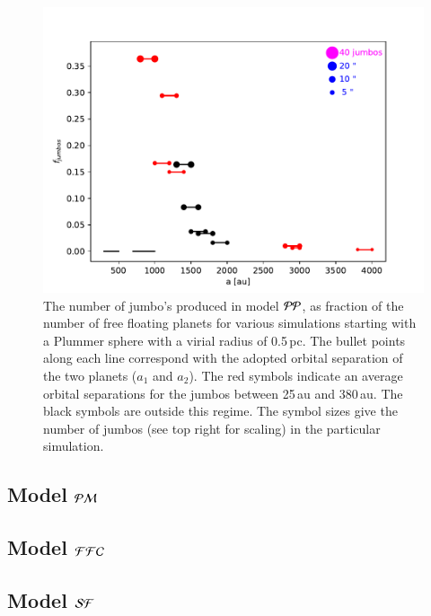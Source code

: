 \documentclass[aa]{lib/aa}
\begin{document}
\begin{figure}
    \centering
        \includegraphics[width=.91\columnwidth]{figures/fig_fjumbos_from_psystems.pdf}
        \caption{The number of jumbo's produced in model ${\cal PP}$,
          as fraction of the number of free floating planets for
          various simulations starting with a Plummer sphere with a
          virial radius of 0.5\,pc.  The bullet points along each line
          correspond with the adopted orbital separation of the two
          planets ($a_1$ and $a_2$).  The red symbols indicate an
          average orbital separations for the jumbos between 25\,au
          and 380\,au.  The black symbols are outside this regime.
          The symbol sizes give the number of jumbos (see top right
          for scaling) in the particular simulation.  }
         \label{Fig:fjumbos_from_PP}
\end{figure}

\subsection{Model ${\cal PM}$}


\subsection{Model ${\cal FFC}$}

\subsection{Model ${\cal SF}$}
\end{document}
